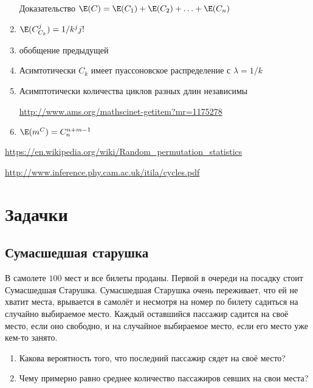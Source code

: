 \documentclass[10pt]{article}
\begin{document}
\begin{enumerate}
Доказательство $\E(C)=\E(C_1)+\E(C_2) + \ldots + \E(C_n)$


\item $\E( C_{C_k}^j ) =1/k^jj!$

\item обобщение предыдущей

\item Асимтотически $C_k$ имеет пуассоновское распределение с $\lambda = 1/k$


\item Асимптотически количества циклов разных длин независимы 

\url{http://www.ams.org/mathscinet-getitem?mr=1175278}

\item $\E(m^C)=C_n^{n+m-1}$

\end{enumerate}


\url{https://en.wikipedia.org/wiki/Random_permutation_statistics}

\url{http://www.inference.phy.cam.ac.uk/itila/cycles.pdf}



\section{Задачки}

\subsection{Сумасшедшая старушка}

В самолете $100$ мест и все билеты проданы. Первой в очереди на посадку стоит Сумасшедшая Старушка. Сумасшедшая Старушка очень переживает, что ей не хватит места, врывается в самолёт и несмотря на номер по билету садиться на случайно выбираемое место. Каждый оставшийся пассажир садится на своё место, если оно свободно, и на случайное выбираемое место, если его место уже кем-то занято.

\begin{enumerate}
\item Какова вероятность того, что последний пассажир сядет на своё место?
\item Чему примерно равно среднее количество пассажиров севших на свои места?
\end{enumerate}
\end{document}
